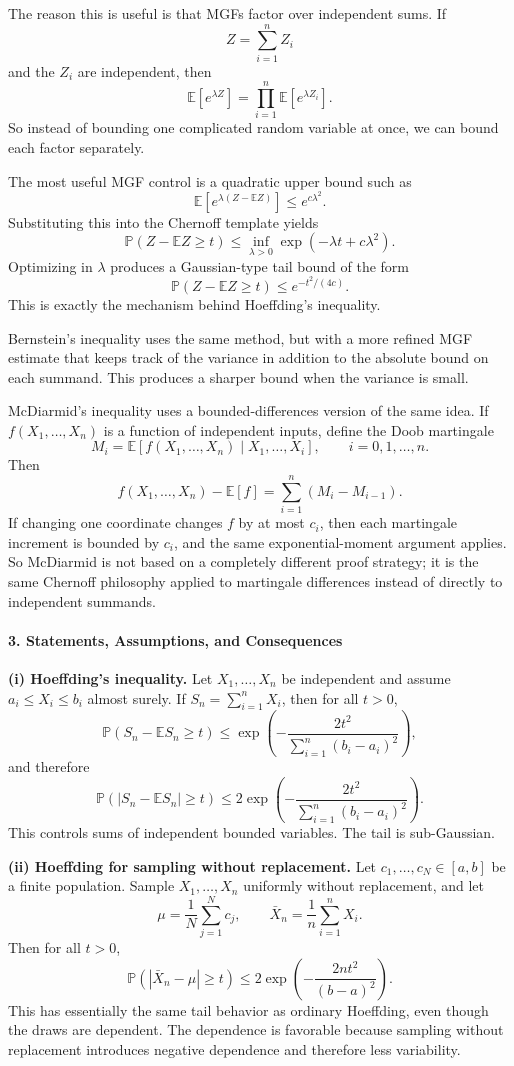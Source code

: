 \documentclass[11pt]{article}
\newcommand{\E}{\mathbb{E}}
\newcommand{\Pbb}{\mathbb{P}}
\begin{document}
\begin{solutionbox}
The reason this is useful is that MGFs factor over independent sums. If
\[
Z=\sum_{i=1}^n Z_i
\]
and the $Z_i$ are independent, then
\[
\E[e^{\lambda Z}] = \prod_{i=1}^n \E[e^{\lambda Z_i}].
\]
So instead of bounding one complicated random variable at once, we can bound each factor separately.

The most useful MGF control is a quadratic upper bound such as
\[
\E[e^{\lambda(Z-\E Z)}] \le e^{c\lambda^2}.
\]
Substituting this into the Chernoff template yields
\[
\Pbb(Z-\E Z\ge t)
\le
\inf_{\lambda>0} \exp(-\lambda t + c\lambda^2).
\]
Optimizing in $\lambda$ produces a Gaussian-type tail bound of the form
\[
\Pbb(Z-\E Z\ge t)\le e^{-t^2/(4c)}.
\]
This is exactly the mechanism behind Hoeffding's inequality.

Bernstein's inequality uses the same method, but with a more refined MGF estimate that keeps track of the variance in addition to the absolute bound on each summand. This produces a sharper bound when the variance is small.

McDiarmid's inequality uses a bounded-differences version of the same idea. If $f(X_1,\dots,X_n)$ is a function of independent inputs, define the Doob martingale
\[
M_i = \E[f(X_1,\dots,X_n)\mid X_1,\dots,X_i], \qquad i=0,1,\dots,n.
\]
Then
\[
f(X_1,\dots,X_n)-\E[f] = \sum_{i=1}^n (M_i-M_{i-1}).
\]
If changing one coordinate changes $f$ by at most $c_i$, then each martingale increment is bounded by $c_i$, and the same exponential-moment argument applies. So McDiarmid is not based on a completely different proof strategy; it is the same Chernoff philosophy applied to martingale differences instead of directly to independent summands.
 \medskip
\paragraph{3. Statements, Assumptions, and Consequences}
\textbf{(i) Hoeffding's inequality.}
Let $X_1,\dots,X_n$ be independent and assume $a_i\le X_i\le b_i$ almost surely. If $S_n=\sum_{i=1}^n X_i$, then for all $t>0$,
\[
\Pbb(S_n-\E S_n\ge t)
\le
\exp\!\left(-\frac{2t^2}{\sum_{i=1}^n (b_i-a_i)^2}\right),
\]
and therefore
\[
\Pbb(|S_n-\E S_n|\ge t)
\le
2\exp\!\left(-\frac{2t^2}{\sum_{i=1}^n (b_i-a_i)^2}\right).
\]
This controls sums of independent bounded variables. The tail is sub-Gaussian.

\medskip
\textbf{(ii) Hoeffding for sampling without replacement.}
Let $c_1,\dots,c_N\in[a,b]$ be a finite population. Sample $X_1,\dots,X_n$ uniformly without replacement, and let
\[
\mu = \frac1N\sum_{j=1}^N c_j, \qquad \bar X_n = \frac1n\sum_{i=1}^n X_i.
\]
Then for all $t>0$,
\[
\Pbb(|\bar X_n-\mu|\ge t)
\le
2\exp\!\left(-\frac{2nt^2}{(b-a)^2}\right).
\]
This has essentially the same tail behavior as ordinary Hoeffding, even though the draws are dependent. The dependence is favorable because sampling without replacement introduces negative dependence and therefore less variability.


\end{solutionbox}
\end{document}
